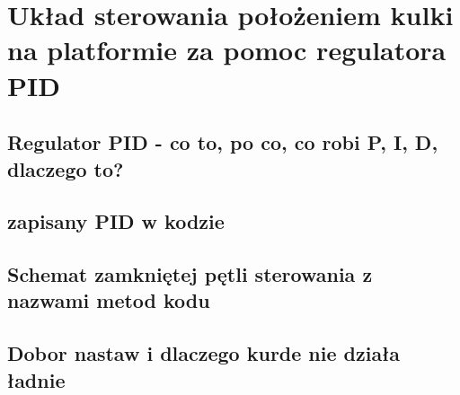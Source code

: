 \newpage %
\section{Układ sterowania położeniem kulki na platformie za pomoc regulatora PID}

\subsection{Regulator PID - co to, po co, co robi P, I, D, dlaczego to?}

\subsection{zapisany PID w kodzie}

\subsection{Schemat zamkniętej pętli sterowania z nazwami metod kodu}

\subsection{Dobor nastaw i dlaczego kurde nie działa ładnie}